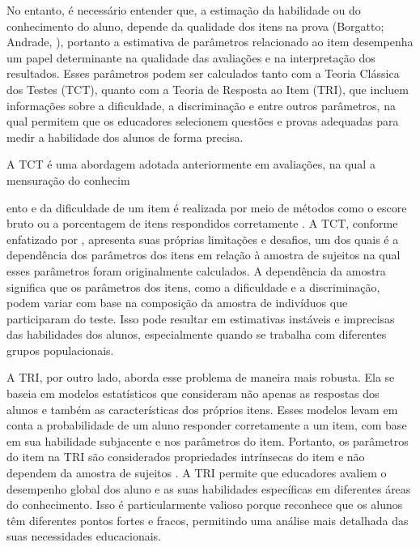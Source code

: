 No entanto, é necessário entender que, a estimação da habilidade ou do conhecimento do aluno, depende da qualidade dos itens na prova (Borgatto; Andrade, \citeyear{BORGATTO2012}), portanto a estimativa de parâmetros relacionado ao item desempenha um papel determinante na qualidade das avaliações e na interpretação dos resultados. Esses parâmetros podem ser calculados tanto com a Teoria Clássica dos Testes (TCT), quanto com a Teoria de Resposta ao Item (TRI), que incluem informações sobre a dificuldade, a discriminação e entre outros parâmetros, na qual permitem que os educadores selecionem questões e provas adequadas para medir a habilidade dos alunos de forma precisa. 

A TCT é uma abordagem adotada anteriormente em avaliações, na qual a mensuração do conhecim

ento e da dificuldade de um item é realizada por meio de métodos como o escore bruto ou a porcentagem de itens respondidos corretamente \cite{pasquali2003}. A TCT, conforme enfatizado por , apresenta suas próprias limitações e desafios, um dos quais é a dependência dos parâmetros dos itens em relação à amostra de sujeitos na qual esses parâmetros foram originalmente calculados. A dependência da amostra significa que os parâmetros dos itens, como a dificuldade e a discriminação, podem variar com base na composição da amostra de indivíduos que participaram do teste. Isso pode resultar em estimativas instáveis e imprecisas das habilidades dos alunos, especialmente quando se trabalha com diferentes grupos populacionais.

\begin{comment}
	 É importante ressaltar que, de acordo com Pasquali (2003), a TCT não mede diretamente o traço latente e sim avalia o comportamento observado dos alunos em relação aos itens.
\end{comment}


A TRI, por outro lado, aborda esse problema de maneira mais robusta. Ela se baseia em modelos estatísticos que consideram não apenas as respostas dos alunos e também as características dos próprios itens. Esses modelos levam em conta a probabilidade de um aluno responder corretamente a um item, com base em sua habilidade subjacente e nos parâmetros do item. Portanto, os parâmetros do item na TRI são considerados propriedades intrínsecas do item e não dependem da amostra de sujeitos \cite{pasquali2018}. A TRI permite que educadores avaliem o desempenho global dos aluno e as suas habilidades específicas em diferentes áreas do conhecimento. Isso é particularmente valioso porque reconhece que os alunos têm diferentes pontos fortes e fracos, permitindo uma análise mais detalhada das suas necessidades educacionais. 

